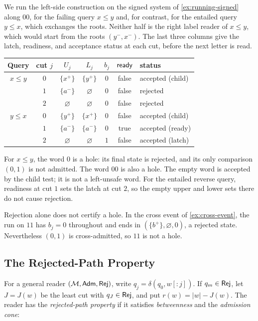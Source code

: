 \begin{example}\label{ex:running-reader}
We run the left-side construction on the signed system of
\cref{ex:running-signed} along $00$, for the failing query $x\le y$ and,
for contrast, for the entailed query $y\le x$, which exchanges the roots.
Neither half is the right label reader of $x\le y$, which would start
from the roots $(y^-,x^-)$. The last three columns give the latch, readiness,
and acceptance status at each cut, before the next letter is read.
\begin{center}
\small
\begin{tabular}{@{}ccccccl@{}}
\toprule
Query & cut $j$ & $U_j$ & $L_j$ & $b_j$ & $\mathsf{ready}$ & status\\
\midrule
$x\le y$ & $0$ & $\{x^+\}$ & $\{y^+\}$ & $0$ & false & accepted (child)\\
 & $1$ & $\{a^-\}$ & $\varnothing$ & $0$ & false & rejected\\
 & $2$ & $\varnothing$ & $\varnothing$ & $0$ & false & rejected\\
\midrule
$y\le x$ & $0$ & $\{y^+\}$ & $\{x^+\}$ & $0$ & false & accepted (child)\\
 & $1$ & $\{a^-\}$ & $\{a^-\}$ & $0$ & true & accepted (ready)\\
 & $2$ & $\varnothing$ & $\varnothing$ & $1$ & false & accepted (latch)\\
\bottomrule
\end{tabular}
\end{center}
For $x\le y$, the word $0$ is a hole: its final state is rejected,
and its only comparison $(0,1)$ is not admitted. The word $00$ is also
a hole. The empty word is accepted by the child test; it is not a
left-unsafe word. For the entailed reverse query, readiness at cut $1$
sets the latch at cut $2$, so the empty upper and lower sets there do
not cause rejection.

Rejection alone does not certify a hole. In the cross event of
\cref{ex:cross-event}, the run on $11$ has $b_j=0$ throughout and ends
in $(\{b^+\},\varnothing,0)$, a rejected state. Nevertheless $(0,1)$
is cross-admitted, so $11$ is not a hole.
\end{example}

\subsection{The Rejected-Path Property}\label{sec:interface}
For a general reader $(\mathcal{M},\mathsf{Adm},\mathsf{Rej})$, write $q_j=\delta(q_0,w[:j])$. If $q_m\in\mathsf{Rej}$,
let $J=J(w)$ be the least cut with $q_J\in\mathsf{Rej}$, and put $r(w)=|w|-J(w)$. The reader has the
\emph{rejected-path property} if it satisfies \emph{betweenness} and
the \emph{admission cone}:

